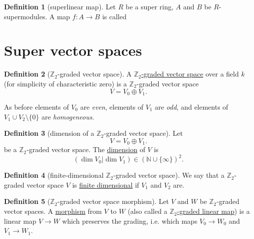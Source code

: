 \documentclass[a4paper]{report}
\newcommand{\Z}{\mathbb{Z}}
\newcommand{\N}{\mathbb{N}}
\newcommand{\defn}[1]{\ul{#1}}
\theoremstyle{definition}
\newtheorem{definition}{Definition}[section]
\theoremstyle{plain}
\theoremstyle{remark}
\begin{document}
\begin{definition}[superlinear map]
  \label{def:superlinear}
  Let $R$ be a super ring, $A$ and $B$ be $R$-supermodules. A map $f\colon A \to B$ is called 
\end{definition}

\section{Super vector spaces}
\begin{definition}[$\Z_{2}$-graded vector space]
  \label{def:z2gradedvectorspace}
  A \defn{$\Z_{2}$-graded vector space} over a field $k$ (for simplicity of characteristic zero) is a $\Z_{2}$-graded vector space
  \begin{equation*}
    V = V_{0} \oplus V_{1}.
  \end{equation*}
\end{definition}
As before elements of $V_{0}$ are \emph{even}, elements of $V_{1}$ are \emph{odd}, and elements of $V_{1} \cup V_{2} \setminus \{0\}$ are \emph{homogeneous}.

\begin{definition}[dimension of a $\Z_{2}$-graded vector space]
  \label{def:dimensionofaz2gradedvectorspace}
  Let 
  \begin{equation*}
    V = V_{0} \oplus V_{1}.
  \end{equation*}
  be a $\Z_{2}$-graded vector space. The \defn{dimension} of $V$ is
  \begin{equation*}
    (\dim V_{0}| \dim V_{1}) \in (\N \cup \{\infty\})^{2}.
  \end{equation*}
\end{definition} 

\begin{definition}[finite-dimensional $\Z_{2}$-graded vector space]
  \label{def:finitedimensionalz2gradedvectorspace}
  We say that a $\Z_{2}$-graded vector space $V$ is \defn{finite dimensional} if $V_{1}$ and $V_{2}$ are.
\end{definition}

\begin{definition}[$\Z_{2}$-graded vector space morphism]
  \label{def:z2gradedvectorspacemorphism}
  Let $V$ and $W$ be $\Z_{2}$-graded vector spaces. A \defn{morphism} from $V$ to $W$ (also called a \defn{$\Z_{2}$-graded linear map}) is a linear map $V \to W$ which preserves the grading, i.e. which maps $V_{0} \to W_{0}$ and $V_{1} \to W_{1}$.
\end{definition}
\end{document}
